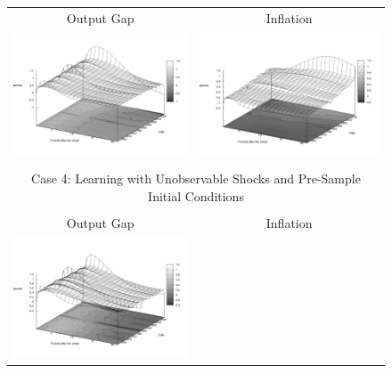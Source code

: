 \begin{figure}
\begin{tabular}{cc}
Output Gap & Inflation \\ 
\includegraphics[scale=0.25]{results_reinit/Output_natshock_irf3d.png} & 
\includegraphics[scale=0.25]{results_reinit/Inflation_natshock_irf3d.png} \\ \\ 
\multicolumn{2}{c}{Case 4: Learning with Unobservable Shocks and Pre-Sample Initial Conditions}\\ \\
Output Gap & Inflation \\ 
\includegraphics[scale=0.25]{results_wlsinit/Output_natshock_irf3d.png} & 

\end{tabular}
\end{figure}
